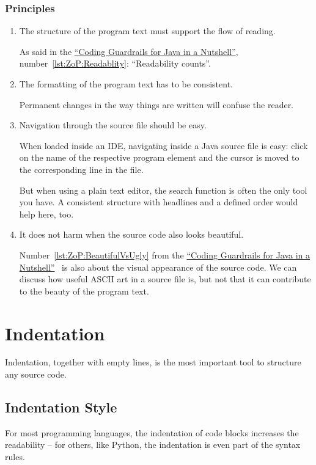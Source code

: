 \documentclass[11pt,a4paper, titlepage, parskip=half, headsepline, footsepline, cleardoublepage=current, headheight=1cm]{scrbook}
\newcommand*{\ngref}{\hyperref[lst:NutshellGuardrails]{“Coding Guardrails for Java in a Nutshell”}}
\begin{document}
\subsubsection{Principles}
\begin{enumerate}[label=P\arabic*.]
	\item{The structure of the program text must support the flow of reading.
	
	As said in the \ngref, number~\ref{lst:ZoP:Readablity}: “Readability counts”.}
	
	\item{The formatting of the program text has to be consistent.
	
	Permanent changes in the way things are written will confuse the reader.}
	
	\item{Navigation through the source file should be easy.
	
	When loaded inside an IDE, navigating inside a Java source file is easy: click on the name of the respective program element and the cursor is moved to the corresponding line in the file.
	
	But when using a plain text editor, the search function is often the only tool you have. A consistent structure with headlines and a defined order would help here, too.}
	
	\item{It does not harm when the source code also looks beautiful.
	
	Number~\ref{lst:ZoP:BeautifulVsUgly} from the \ngref~ is also about the visual appearance of the source code. We can discuss how useful ASCII art in a source file is, but not that it can contribute to the beauty of the program text.}
\end{enumerate}

\section{Indentation}\label{sec:Indentation}
Indentation, together with empty lines, is the most important tool to structure any source code.

\subsection{Indentation Style}\label{sec:IndentationStyle}
For most programming languages, the indentation of code blocks increases the readability – for others, like Python\autocite{W3SCHOOLS:PythonIndentation}, the indentation is even part of the syntax rules.
\end{document}
